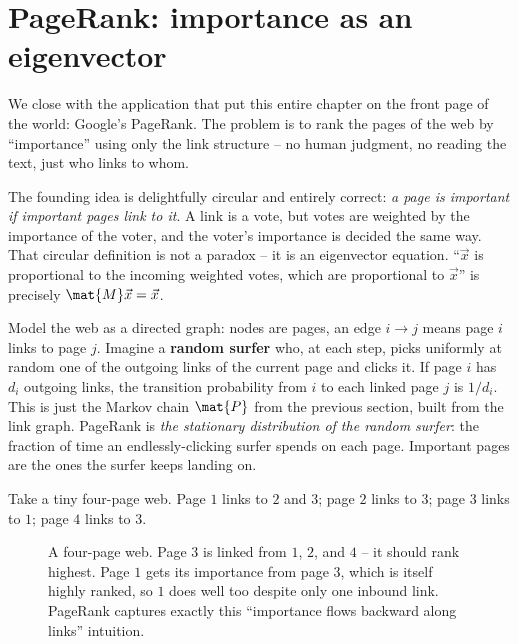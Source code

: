 \section{PageRank: importance as an eigenvector}
\label{ch35:pagerank}

We close with the application that put this entire chapter on the front page of the world:
Google's PageRank. The problem is to rank the pages of the web by ``importance'' using only
the link structure -- no human judgment, no reading the text, just who links to whom.

\begin{intuitionbox}
The founding idea is delightfully circular and entirely correct: \emph{a page is important
if important pages link to it}. A link is a vote, but votes are weighted by the importance
of the voter, and the voter's importance is decided the same way. That circular definition
is not a paradox -- it is an eigenvector equation. ``$\vec{x}$ is proportional to the
incoming weighted votes, which are proportional to $\vec{x}$'' is precisely
$\mat{M}\vec{x} = \vec{x}$.
\end{intuitionbox}

Model the web as a directed graph: nodes are pages, an edge $i \to j$ means page $i$ links
to page $j$. Imagine a \textbf{random surfer} who, at each step, picks uniformly at random
one of the outgoing links of the current page and clicks it. If page $i$ has $d_i$ outgoing
links, the transition probability from $i$ to each linked page $j$ is $1/d_i$. This is just
the Markov chain $\mat{P}$ from the previous section, built from the link graph. PageRank is
\emph{the stationary distribution of the random surfer}: the fraction of time an
endlessly-clicking surfer spends on each page. Important pages are the ones the surfer keeps
landing on.

Take a tiny four-page web. Page $1$ links to $2$ and $3$; page $2$ links to $3$; page $3$
links to $1$; page $4$ links to $3$.

\begin{figure}[H]
\centering
{}
\caption{A four-page web. Page $3$ is linked from $1$, $2$, and $4$ -- it should rank
highest. Page $1$ gets its importance from page $3$, which is itself highly ranked, so $1$
does well too despite only one inbound link. PageRank captures exactly this ``importance
flows backward along links'' intuition.}
\label{ch35:fig-web}
\end{figure}

